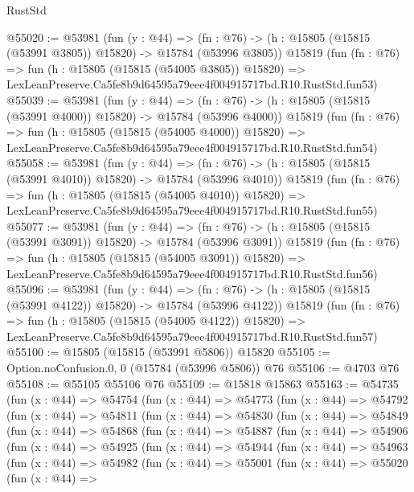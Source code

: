 \begin{lexlean}{RustStd}
\begin{coremodule}
@55020 := @53981
    (fun (y : @44) =>
    (fn : @76) -> (h : @15805 (@15815 (@53991 @3805)) @15820) -> @15784 (@53996 @3805))
    @15819
    (fun (fn : @76) =>
    fun (h : @15805 (@15815 (@54005 @3805)) @15820) =>
    LexLeanPreserve.Ca5fe8b9d64595a79eee4f004915717bd.R10.RustStd.fun53)
@55039 := @53981
    (fun (y : @44) =>
    (fn : @76) -> (h : @15805 (@15815 (@53991 @4000)) @15820) -> @15784 (@53996 @4000))
    @15819
    (fun (fn : @76) =>
    fun (h : @15805 (@15815 (@54005 @4000)) @15820) =>
    LexLeanPreserve.Ca5fe8b9d64595a79eee4f004915717bd.R10.RustStd.fun54)
@55058 := @53981
    (fun (y : @44) =>
    (fn : @76) -> (h : @15805 (@15815 (@53991 @4010)) @15820) -> @15784 (@53996 @4010))
    @15819
    (fun (fn : @76) =>
    fun (h : @15805 (@15815 (@54005 @4010)) @15820) =>
    LexLeanPreserve.Ca5fe8b9d64595a79eee4f004915717bd.R10.RustStd.fun55)
@55077 := @53981
    (fun (y : @44) =>
    (fn : @76) -> (h : @15805 (@15815 (@53991 @3091)) @15820) -> @15784 (@53996 @3091))
    @15819
    (fun (fn : @76) =>
    fun (h : @15805 (@15815 (@54005 @3091)) @15820) =>
    LexLeanPreserve.Ca5fe8b9d64595a79eee4f004915717bd.R10.RustStd.fun56)
@55096 := @53981
    (fun (y : @44) =>
    (fn : @76) -> (h : @15805 (@15815 (@53991 @4122)) @15820) -> @15784 (@53996 @4122))
    @15819
    (fun (fn : @76) =>
    fun (h : @15805 (@15815 (@54005 @4122)) @15820) =>
    LexLeanPreserve.Ca5fe8b9d64595a79eee4f004915717bd.R10.RustStd.fun57)
@55100 := @15805 (@15815 (@53991 @5806)) @15820
@55105 := Option.noConfusion.{0, 0} (@15784 (@53996 @5806)) @76
@55106 := @4703 @76
@55108 := @55105 @55106 @76
@55109 := @15818 @15863
@55163 := @54735
    (fun (x : @44) =>
    @54754
      (fun (x : @44) =>
      @54773
        (fun (x : @44) =>
        @54792
          (fun (x : @44) =>
          @54811
            (fun (x : @44) =>
            @54830
              (fun (x : @44) =>
              @54849
                (fun (x : @44) =>
                @54868
                  (fun (x : @44) =>
                  @54887
                    (fun (x : @44) =>
                    @54906
                      (fun (x : @44) =>
                      @54925
                        (fun (x : @44) =>
                        @54944
                          (fun (x : @44) =>
                          @54963
                            (fun (x : @44) =>
                            @54982
                              (fun (x : @44) =>
                              @55001
                                (fun (x : @44) =>
                                @55020
                                  (fun (x : @44) =>

\end{coremodule}
\end{lexlean}
